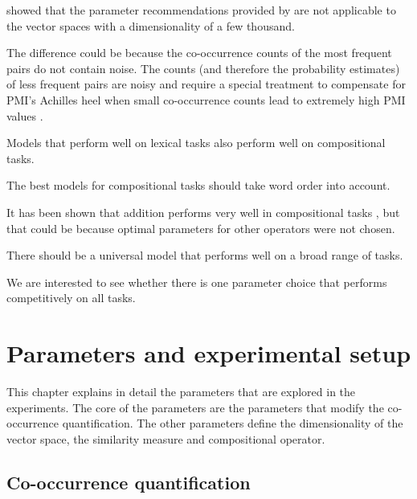  showed that the parameter recommendations provided by  are not applicable to the vector spaces with a dimensionality of a few thousand.

The difference could be because the co-occurrence counts of the most frequent pairs do not contain noise. The counts (and therefore the probability estimates) of less frequent pairs are noisy and require a special treatment to compensate for PMI's Achilles heel when small co-occurrence counts lead to extremely high PMI values \cite{TACL570}.

\begin{hyp}
\label{hyp:not-lextocomp}
Models that perform well on lexical tasks also perform well on compositional tasks.
\end{hyp}

\begin{hyp}
\label{hyp:order}
The best models for compositional tasks should take word order into account.
\end{hyp}

It has been shown that addition performs very well in compositional tasks \cite{milajevs-EtAl:2014:EMNLP2014}, but that could be because optimal parameters for other operators were not chosen.

\begin{hyp}
\label{hyp:universal}
There should be a universal model that performs well on a broad range of tasks.
\end{hyp}

We are interested to see whether there is one parameter choice that performs competitively on all tasks.

\chapter{Parameters and experimental setup}
\label{sec:parameters}

This chapter explains in detail the parameters that are explored in the experiments. The core of the parameters are the parameters that modify the co-occurrence quantification. The other parameters define the dimensionality of the vector space, the similarity measure and compositional operator.
%
%

\section{Co-occurrence quantification}
\label{sec:quantification}

